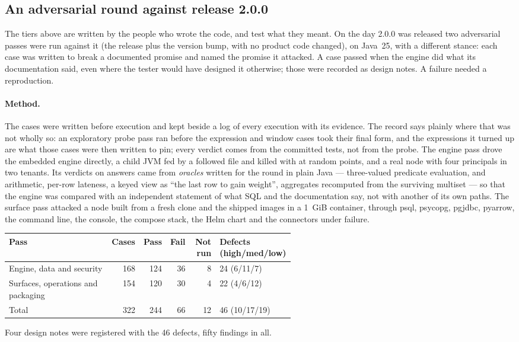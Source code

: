 \documentclass[11pt,a4paper]{article}
\renewcommand{\_}{\oldunderscore\allowbreak}
\newcommand{\code}[1]{\texttt{\pvbreakable{#1}}}
\begin{document}
\subsection{An adversarial round against release 2.0.0}\label{sec:adversarial}

The tiers above are written by the people who wrote the code, and test what they meant. On the day 2.0.0
was released two adversarial passes were run against it (the release plus the version bump, with no
product code changed), on Java~25, with a different stance: each case was written to break a documented
promise and named the promise it attacked. A case passed when the engine did what its documentation said,
even where the tester would have designed it otherwise; those were recorded as design notes. A failure
needed a reproduction.

\paragraph{Method.} The cases were written before execution and kept beside a log of every execution with
its evidence. The record says plainly where that was not wholly so: an exploratory probe pass ran before
the expression and window cases took their final form, and the expressions it turned up are what those
cases were then written to pin; every verdict comes from the committed tests, not from the probe. The
engine pass drove the embedded engine directly, a child JVM fed by a followed file and killed with
\code{SIGKILL} at random points, and a real node with four principals in two tenants. Its verdicts on
answers came from \emph{oracles} written for the round in plain Java --- three-valued predicate
evaluation, \code{BigInteger} and \code{BigDecimal} arithmetic, per-row lateness, a keyed view as ``the last
row to gain weight'', aggregates recomputed from the surviving multiset --- so that the engine was compared
with an independent statement of what SQL and the documentation say, not with another of its own paths.
The surface pass attacked a node built from a fresh clone and the shipped images in a 1~GiB container,
through psql, psycopg, pgjdbc, pyarrow, the command line, the console, the compose stack, the Helm chart
and the connectors under failure.

\begin{center}
\small
\begin{tabular}{@{}L{0.36\linewidth}rrrrL{0.20\linewidth}@{}}
\toprule
\textbf{Pass} & \textbf{Cases} & \textbf{Pass} & \textbf{Fail} & \textbf{Not run} & \textbf{Defects (high/med/low)}\\
\midrule
Engine, data and security & 168 & 124 & 36 & 8 & 24 (6/11/7)\\
Surfaces, operations and packaging & 154 & 120 & 30 & 4 & 22 (4/6/12)\\
\midrule
Total & 322 & 244 & 66 & 12 & 46 (10/17/19)\\
\bottomrule
\end{tabular}
\end{center}
Four design notes were registered with the 46 defects, fifty findings in all.
\end{document}
